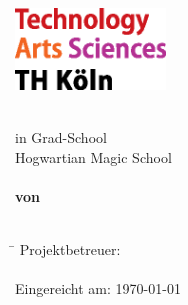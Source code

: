 
\begin{titlepage}

\parbox[t]{\textwidth}{
	\parbox{0.65\textwidth}{
			\includegraphics[width=4cm]{img/title/logo_TH-Koeln_CMYK_22pt.eps}	
	}
	\parbox{0pt}{
	}
}

\begin{center}
	\vspace{3cm}
	\LARGE\textbf{\Arbeit}\\
	\vspace{0.5cm}
	\normalsize	in Grad-School \\Hogwartian Magic School\\
	\vspace{1cm}
	\Large\textbf{\ArbeitThema}\\
	\vspace{0.5cm}
	\normalsize\textbf{von}\\
	\vspace{0.2cm}
	\textbf{\Autor}\\
	\Mail
\end{center}

\vfill
\begin{center}
\begin{small}
\parbox{0cm}{
	\begin{tabbing}
		 \hspace{3.5cm}\=\kill %
		 Projektbetreuer:\> \Prof\\ %
		 \\
		 Eingereicht am:\> \today\\
	\end{tabbing}
	}
\end{small}
\end{center}

\end{titlepage}